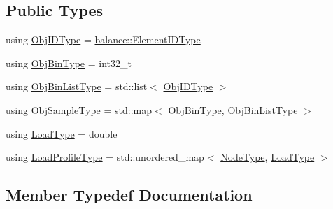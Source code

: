 \subsection*{Public Types}
\begin{DoxyCompactItemize}
\item 
using \hyperlink{structvt_1_1vrt_1_1collection_1_1lb_1_1_greedy_l_b_types_a201f3d97240fe881e1ed6c0d2cfde262}{Obj\+I\+D\+Type} = \hyperlink{namespacevt_1_1vrt_1_1collection_1_1balance_a14c8d2c972f2913aa3f1636e5be0a120}{balance\+::\+Element\+I\+D\+Type}
\item 
using \hyperlink{structvt_1_1vrt_1_1collection_1_1lb_1_1_greedy_l_b_types_ae0dc433e9afe6112dd0a7ba402e0d6c2}{Obj\+Bin\+Type} = int32\+\_\+t
\item 
using \hyperlink{structvt_1_1vrt_1_1collection_1_1lb_1_1_greedy_l_b_types_a5f1f5da7ec80da0de64a9d91624c396b}{Obj\+Bin\+List\+Type} = std\+::list$<$ \hyperlink{structvt_1_1vrt_1_1collection_1_1lb_1_1_greedy_l_b_types_a201f3d97240fe881e1ed6c0d2cfde262}{Obj\+I\+D\+Type} $>$
\item 
using \hyperlink{structvt_1_1vrt_1_1collection_1_1lb_1_1_greedy_l_b_types_a467f8a79d0785fca5fc95bd5c0f406b9}{Obj\+Sample\+Type} = std\+::map$<$ \hyperlink{structvt_1_1vrt_1_1collection_1_1lb_1_1_greedy_l_b_types_ae0dc433e9afe6112dd0a7ba402e0d6c2}{Obj\+Bin\+Type}, \hyperlink{structvt_1_1vrt_1_1collection_1_1lb_1_1_greedy_l_b_types_a5f1f5da7ec80da0de64a9d91624c396b}{Obj\+Bin\+List\+Type} $>$
\item 
using \hyperlink{structvt_1_1vrt_1_1collection_1_1lb_1_1_greedy_l_b_types_a9fe8829bc0c92e88ddf9d149233a54f4}{Load\+Type} = double
\item 
using \hyperlink{structvt_1_1vrt_1_1collection_1_1lb_1_1_greedy_l_b_types_a8af324cd88e83727178631e4d1478932}{Load\+Profile\+Type} = std\+::unordered\+\_\+map$<$ \hyperlink{namespacevt_a866da9d0efc19c0a1ce79e9e492f47e2}{Node\+Type}, \hyperlink{structvt_1_1vrt_1_1collection_1_1lb_1_1_greedy_l_b_types_a9fe8829bc0c92e88ddf9d149233a54f4}{Load\+Type} $>$
\end{DoxyCompactItemize}


\subsection{Member Typedef Documentation}
\mbox{\label{structvt_1_1vrt_1_1collection_1_1lb_1_1_greedy_l_b_types_a8af324cd88e83727178631e4d1478932}} 
